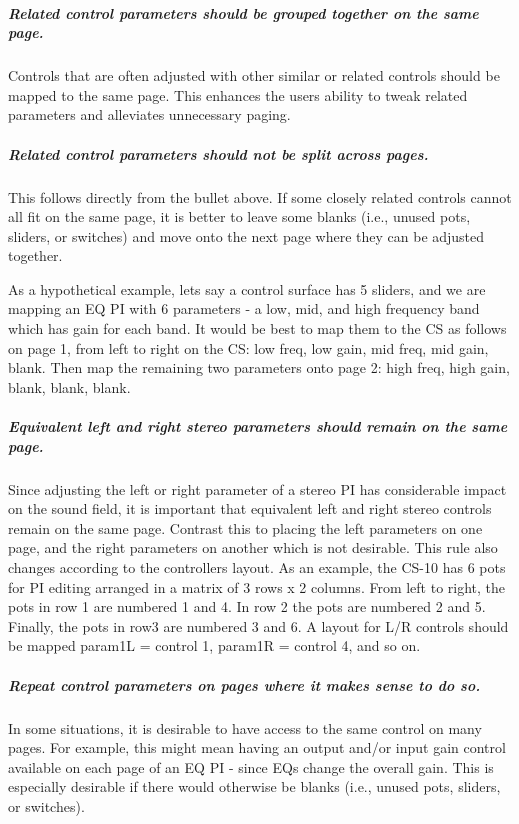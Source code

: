 \subparagraph*{Related control parameters should be grouped together on the same page.}

  Controls that are often \textquotesingle{}adjusted\textquotesingle{} with other similar or related controls should be mapped to the same page. This enhances the users ability to tweak related parameters and alleviates unnecessary paging. 

\subparagraph*{Related control parameters should not be split across pages.}

  This follows directly from the bullet above. If some closely related controls cannot all fit on the same page, it is better to leave some blanks (i.\+e., unused pots, sliders, or switches) and move onto the next page where they can be adjusted together.

 As a hypothetical example, let\textquotesingle{}s say a control surface has 5 sliders, and we are mapping an E\+Q P\+I with 6 parameters -\/ a low, mid, and high frequency band which has gain for each band. It would be best to map them to the C\+S as follows on page 1, from left to right on the C\+S\+: low freq, low gain, mid freq, mid gain, blank. Then map the remaining two parameters onto page 2\+: high freq, high gain, blank, blank, blank. 

\subparagraph*{Equivalent left and right stereo parameters should remain on the same page.}

  Since adjusting the left or right parameter of a stereo P\+I has considerable impact on the sound field, it is important that equivalent left and right stereo controls remain on the same page. Contrast this to placing the left parameters on one page, and the right parameters on another which is not desirable. This rule also changes according to the controller\textquotesingle{}s layout. As an example, the C\+S-\/10 has 6 pots for P\+I editing arranged in a matrix of 3 rows x 2 columns. From left to right, the pots in row 1 are numbered 1 and 4. In row 2 the pots are numbered 2 and 5. Finally, the pots in row3 are numbered 3 and 6. A layout for L/\+R controls should be mapped param1\+L = control 1, param1\+R = control 4, and so on. 

\subparagraph*{Repeat control parameters on pages where it makes sense to do so.}

  In some situations, it is desirable to have access to the same control on many pages. For example, this might mean having an output and/or input gain control available on each page of an E\+Q P\+I -\/ since E\+Qs change the overall gain. This is especially desirable if there would otherwise be blanks (i.\+e., unused pots, sliders, or switches). 



